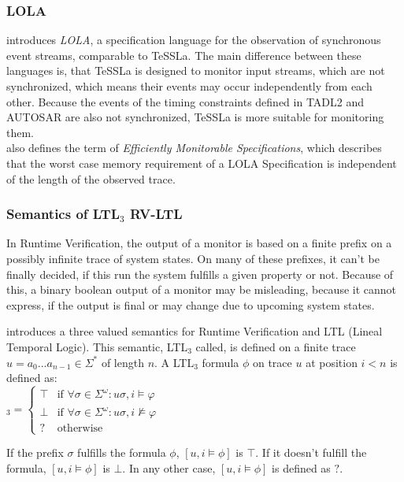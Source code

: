 	\subsubsection{LOLA}
		\cite{LOLA} introduces \textit{LOLA}, a specification language for the observation of synchronous event streams, comparable to TeSSLa. The main difference between these languages is, that TeSSLa is designed to monitor input streams, which are not synchronized, which means their events may occur independently from each other. Because the events of the timing constraints defined in TADL2 and AUTOSAR are also not synchronized, TeSSLa is more suitable for monitoring them.\\
		\cite{LOLA} also defines the term of \textit{Efficiently Monitorable Specifications}, which describes that the worst case memory requirement of a LOLA Specification is independent of the length of the observed trace.
		
	\subsubsection{Semantics of LTL$_3$\cite{1157} RV-LTL\cite{10.1007/978-3-540-77395-5_11}}
		In Runtime Verification, the output of a monitor is based on a finite prefix on a possibly infinite trace of system states. On many of these prefixes, it can't be finally decided, if this run the system fulfills a given property or not.  Because of this, a binary boolean output of a monitor may be misleading, because it cannot express, if the output is final or may change due to upcoming system states.\\
		\begin{definition}
		\cite{1157} introduces a three valued semantics for Runtime Verification and LTL (Lineal Temporal Logic). This semantic, LTL$_3$ called, is defined on a finite trace $u=a_0...a_{n-1}\in\Sigma^*$ of length $n$. A LTL$_3$ formula $\phi$ on trace $u$ at position $i < n$ is defined as:\\
			\begin{math}
				[u,i\models\varphi]_3=
					\begin{cases}
						\top & \text{if } \forall \sigma\in\Sigma^\omega:u\sigma,i \vDash\varphi\\
						\bot & \text{if } \forall \sigma\in\Sigma^\omega:u\sigma,i \nvDash\varphi\\
						? & \text{otherwise }
					\end{cases}
			\end{math}
		\end{definition}
		If the prefix $\sigma$ fulfills the formula $\phi$, $[u,i\models\phi]$ is $\top$. If it doesn't fulfill the formula, $[u,i\models\phi]$ is $\bot$. In any other case, $[u,i\models\phi]$  is defined as $?$.\\ \\
		
